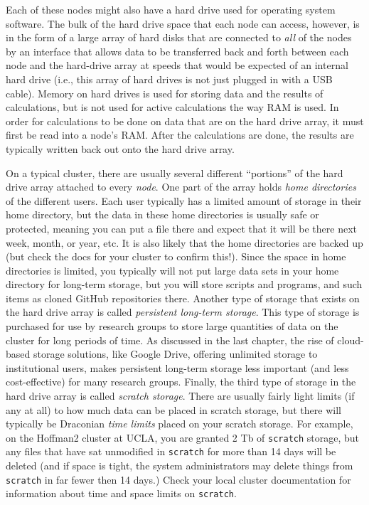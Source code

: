 \documentclass[]{krantz}
\begin{document}
Each of these
nodes might also have a hard drive used for operating system software. The bulk of the
hard drive space that each node can access, however, is in the form of a large array of hard disks
that are connected to \emph{all} of the nodes by an interface that allows data to be transferred
back and forth between each node and the hard-drive array at speeds that would be expected of
an internal hard drive (i.e., this array of hard drives is not just plugged in with a USB
cable). Memory on hard drives is used for storing data and the results of calculations, but
is not used for active calculations the way RAM is used. In order for calculations to be done
on data that are on the hard drive array, it must first be read into a node's RAM. After the calculations
are done, the results are typically written back out onto the hard drive array.

On a typical cluster, there are usually several different ``portions'' of the hard drive
array attached to every \emph{node}. One part of the array holds \emph{home directories} of the
different users. Each user typically has a limited amount of storage in their home directory, but
the data in these home directories is usually safe or protected, meaning you can put a file there
and expect that it will be there next week, month, or year, etc. It is also likely that the home directories are
backed up (but check the docs for your cluster to confirm this!). Since the space in home directories is limited,
you typically will not put large data sets in your home directory for long-term storage, but you will
store scripts and programs, and such items as cloned GitHub repositories there. Another
type of storage that exists on the hard drive array is called \emph{persistent long-term storage}. This type of storage
is purchased for use by research groups to store large quantities of
data on the cluster for long periods of time. As discussed in the last chapter, the rise of cloud-based storage solutions,
like Google Drive, offering unlimited storage to institutional users, makes persistent long-term storage less
important (and less cost-effective) for many research groups. Finally, the third type of
storage in the hard drive array is called \emph{scratch storage}. There are usually fairly
light limits (if any at all) to how much data can be placed in scratch storage, but there
will typically be Draconian \emph{time limits} placed on your scratch storage. For example, on the
Hoffman2 cluster at UCLA, you are granted 2 Tb of \texttt{scratch} storage, but any files that
have sat unmodified in \texttt{scratch} for more than 14 days will be deleted (and if space is tight, the
system administrators may delete things from \texttt{scratch} in far fewer then 14 days.) Check
your local cluster documentation for information about time and space limits on \texttt{scratch}.
\end{document}
